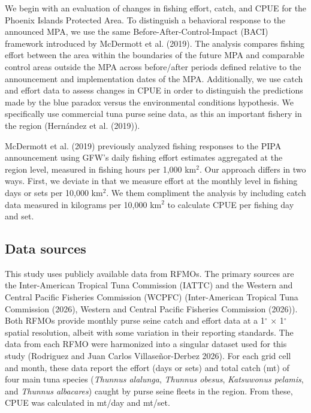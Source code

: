 \documentclass[
  letterpaper,
  DIV=11,
  numbers=noendperiod]{scrartcl}
\begin{document}
We begin with an evaluation of changes in fishing effort, catch, and
CPUE for the Phoenix Islands Protected Area. To distinguish a behavioral
response to the announced MPA, we use the same
Before-After-Control-Impact (BACI) framework introduced by McDermott et
al. (2019). The analysis compares fishing effort between the area within
the boundaries of the future MPA and comparable control areas outside
the MPA across before/after periods defined relative to the announcement
and implementation dates of the MPA. Additionally, we use catch and
effort data to assess changes in CPUE in order to distinguish the
predictions made by the blue paradox versus the environmental conditions
hypothesis. We specifically use commercial tuna purse seine data, as
this an important fishery in the region (Hernández et al. (2019)).

McDermott et al. (2019) previously analyzed fishing responses to the
PIPA announcement using GFW's daily fishing effort estimates aggregated
at the region level, measured in fishing hours per 1,000 km\(^2\). Our
approach differs in two ways. First, we deviate in that we measure
effort at the monthly level in fishing days or sets per 10,000 km\(^2\).
We them compliment the analysis by including catch data measured in
kilograms per 10,000 km\(^2\) to calculate CPUE per fishing day and set.

\subsection{Data sources}\label{data-sources}

This study uses publicly available data from RFMOs. The primary sources
are the Inter-American Tropical Tuna Commission (IATTC) and the Western
and Central Pacific Fisheries Commission (WCPFC) (Inter-American
Tropical Tuna Commission (2026), Western and Central Pacific Fisheries
Commission (2026)). Both RFMOs provide monthly purse seine catch and
effort data at a 1\(^\circ\) × 1\(^\circ\) spatial resolution, albeit
with some variation in their reporting standards. The data from each
RFMO were harmonized into a singular dataset used for this study
(Rodriguez and Juan Carlos Villaseñor-Derbez 2026). For each grid cell
and month, these data report the effort (days or sets) and total catch
(mt) of four main tuna species (\emph{Thunnus alalunga}, \emph{Thunnus
obesus}, \emph{Katsuwonus pelamis}, and \emph{Thunnus albacares}) caught
by purse seine fleets in the region. From these, CPUE was calculated in
mt/day and mt/set.
\end{document}
